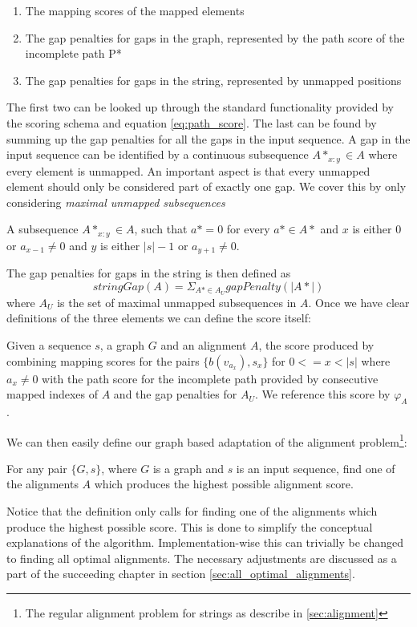 \documentclass[thesis.tex]{subfiles}
\begin{document}
{\begin{enumerate}
  \item The mapping scores of the mapped elements
  \item The gap penalties for gaps in the graph, represented by the path score of the incomplete path P*
  \item The gap penalties for gaps in the string, represented by unmapped positions
\end{enumerate}
The first two can be looked up through the standard functionality provided by the scoring schema and equation \ref{eq:path_score}. The last can be found by summing up the gap penalties for all the gaps in the input sequence. A gap in the input sequence can be identified by a continuous subsequence $A*_{x:y} \in A$ where every element is unmapped. An important aspect is that every unmapped element should only be considered part of exactly one gap. We cover this by only considering \textit{maximal unmapped subsequences}
\begin{defn}
  A subsequence $A*_{x:y} \in A$, such that $a*=0$ for every $a* \in A*$ and $x$ is either $0$ or $a_{x-1} \neq 0$ and $y$ is either $|s|-1$ or $a_{y+1} \neq 0$.
\end{defn}
The gap penalties for gaps in the string is then defined as 
\begin{equation}
  stringGap(A)=\Sigma_{A* \in A_U} gapPenalty(|A*|)
\end{equation}
where $A_U$ is the set of maximal unmapped subsequences in $A$. Once we have clear definitions of the three elements we can define the score itself:
\begin{defn}
  Given a sequence $s$, a graph $G$ and an alignment $A$, the score produced by combining mapping scores for the pairs $\{b(v_{a_x}), s_x\}$ for $0<=x<|s|$ where $a_x \neq 0$ with the path score for the incomplete path provided by consecutive mapped indexes of $A$ and the gap penalties for $A_U$. We reference this score by $\varphi_A$.
\end{defn}
We can then easily define our graph based adaptation of the alignment problem\footnote{The regular alignment problem for strings as describe in \ref{sec:alignment}}:
\begin{defn}
  For any pair $\{G, s\}$, where $G$ is a graph and $s$ is an input sequence, find one of the alignments $A$ which produces the highest possible alignment score.
\end{defn}
Notice that the definition only calls for finding one of the alignments which produce the highest possible score. This is done to simplify the conceptual explanations of the algorithm. Implementation-wise this can trivially be changed to finding all optimal alignments. The necessary adjustments are discussed as a part of the succeeding chapter in section \ref{sec:all_optimal_alignments}.\\
}
\end{document}
